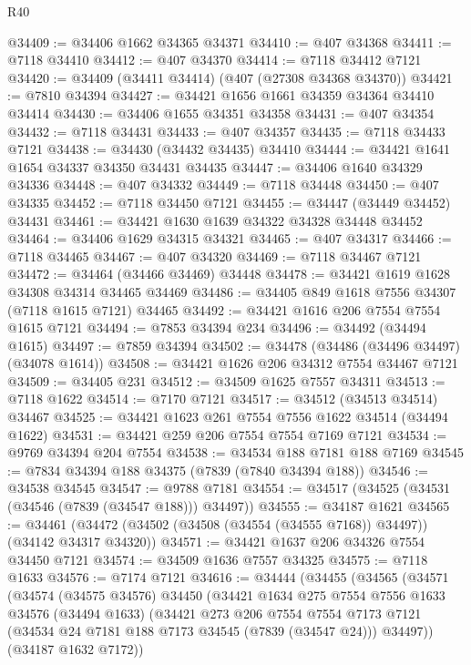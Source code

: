 \begin{lexlean}{R40}
\begin{coremodule}
@34409 := @34406 @1662 @34365 @34371
@34410 := @407 @34368
@34411 := @7118 @34410
@34412 := @407 @34370
@34414 := @7118 @34412 @7121
@34420 := @34409 (@34411 @34414) (@407 (@27308 @34368 @34370))
@34421 := @7810 @34394
@34427 := @34421 @1656 @1661 @34359 @34364 @34410 @34414
@34430 := @34406 @1655 @34351 @34358
@34431 := @407 @34354
@34432 := @7118 @34431
@34433 := @407 @34357
@34435 := @7118 @34433 @7121
@34438 := @34430 (@34432 @34435) @34410
@34444 := @34421 @1641 @1654 @34337 @34350 @34431 @34435
@34447 := @34406 @1640 @34329 @34336
@34448 := @407 @34332
@34449 := @7118 @34448
@34450 := @407 @34335
@34452 := @7118 @34450 @7121
@34455 := @34447 (@34449 @34452) @34431
@34461 := @34421 @1630 @1639 @34322 @34328 @34448 @34452
@34464 := @34406 @1629 @34315 @34321
@34465 := @407 @34317
@34466 := @7118 @34465
@34467 := @407 @34320
@34469 := @7118 @34467 @7121
@34472 := @34464 (@34466 @34469) @34448
@34478 := @34421 @1619 @1628 @34308 @34314 @34465 @34469
@34486 := @34405 @849 @1618 @7556 @34307 (@7118 @1615 @7121) @34465
@34492 := @34421 @1616 @206 @7554 @7554 @1615 @7121
@34494 := @7853 @34394 @234
@34496 := @34492 (@34494 @1615)
@34497 := @7859 @34394
@34502 := @34478 (@34486 (@34496 @34497) (@34078 @1614))
@34508 := @34421 @1626 @206 @34312 @7554 @34467 @7121
@34509 := @34405 @231
@34512 := @34509 @1625 @7557 @34311
@34513 := @7118 @1622
@34514 := @7170 @7121
@34517 := @34512 (@34513 @34514) @34467
@34525 := @34421 @1623 @261 @7554 @7556 @1622 @34514 (@34494 @1622)
@34531 := @34421 @259 @206 @7554 @7554 @7169 @7121
@34534 := @9769 @34394 @204 @7554
@34538 := @34534 @188 @7181 @188 @7169
@34545 := @7834 @34394 @188 @34375 (@7839 (@7840 @34394 @188))
@34546 := @34538 @34545
@34547 := @9788 @7181
@34554 := @34517 (@34525 (@34531 (@34546 (@7839 (@34547 @188))) @34497))
@34555 := @34187 @1621
@34565 := @34461 (@34472 (@34502 (@34508 (@34554 (@34555 @7168)) @34497)) (@34142 @34317 @34320))
@34571 := @34421 @1637 @206 @34326 @7554 @34450 @7121
@34574 := @34509 @1636 @7557 @34325
@34575 := @7118 @1633
@34576 := @7174 @7121
@34616 := @34444
    (@34455
      (@34565
        (@34571
          (@34574
            (@34575 @34576)
            @34450
            (@34421
              @1634
              @275
              @7554
              @7556
              @1633
              @34576
              (@34494 @1633)
              (@34421
                @273
                @206
                @7554
                @7554
                @7173
                @7121
                (@34534 @24 @7181 @188 @7173 @34545 (@7839 (@34547 @24)))
                @34497))
            (@34187 @1632 @7172))

\end{coremodule}
\end{lexlean}
